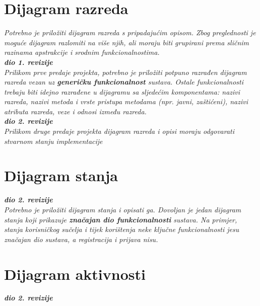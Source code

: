 			
			\eject
			
			
		\section{Dijagram razreda}
		
			\textit{Potrebno je priložiti dijagram razreda s pripadajućim opisom. Zbog preglednosti je moguće dijagram razlomiti na više njih, ali moraju biti grupirani prema sličnim razinama apstrakcije i srodnim funkcionalnostima.}\\
			
			\textbf{\textit{dio 1. revizije}}\\
			
			\textit{Prilikom prve predaje projekta, potrebno je priložiti potpuno razrađen dijagram razreda vezan uz \textbf{generičku funkcionalnost} sustava. Ostale funkcionalnosti trebaju biti idejno razrađene u dijagramu sa sljedećim komponentama: nazivi razreda, nazivi metoda i vrste pristupa metodama (npr. javni, zaštićeni), nazivi atributa razreda, veze i odnosi između razreda.}\\
			
			\textbf{\textit{dio 2. revizije}}\\			
			
			\textit{Prilikom druge predaje projekta dijagram razreda i opisi moraju odgovarati stvarnom stanju implementacije}
			
			
			
			\eject
		
		\section{Dijagram stanja}
			
			
			\textbf{\textit{dio 2. revizije}}\\
			
			\textit{Potrebno je priložiti dijagram stanja i opisati ga. Dovoljan je jedan dijagram stanja koji prikazuje \textbf{značajan dio funkcionalnosti} sustava. Na primjer, stanja korisničkog sučelja i tijek korištenja neke ključne funkcionalnosti jesu značajan dio sustava, a registracija i prijava nisu. }
			
			
			\eject 
		
		\section{Dijagram aktivnosti}
			
			\textbf{\textit{dio 2. revizije}}\\
			
